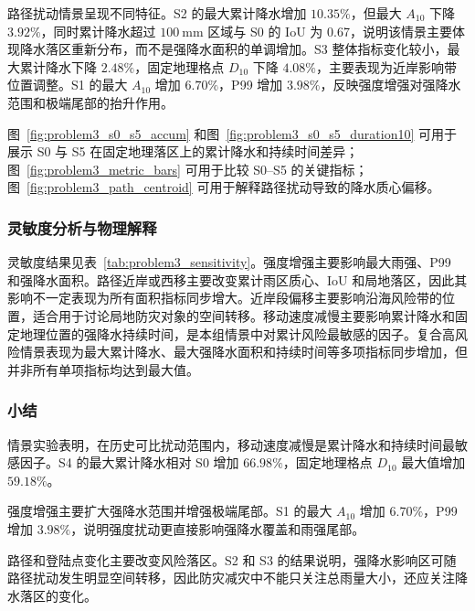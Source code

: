 路径扰动情景呈现不同特征。S2 的最大累计降水增加 $10.35\%$，但最大 $A_{10}$ 下降 $3.92\%$，同时累计降水超过 $100\ \mathrm{mm}$ 区域与 S0 的 IoU 为 0.67，说明该情景主要体现降水落区重新分布，而不是强降水面积的单调增加。S3 整体指标变化较小，最大累计降水下降 $2.48\%$，固定地理格点 $D_{10}$ 下降 $4.08\%$，主要表现为近岸影响带位置调整。S1 的最大 $A_{10}$ 增加 $6.70\%$，P99 增加 $3.98\%$，反映强度增强对强降水范围和极端尾部的抬升作用。

图~\ref{fig:problem3_s0_s5_accum} 和图~\ref{fig:problem3_s0_s5_duration10} 可用于展示 S0 与 S5 在固定地理落区上的累计降水和持续时间差异；图~\ref{fig:problem3_metric_bars} 可用于比较 S0--S5 的关键指标；图~\ref{fig:problem3_path_centroid} 可用于解释路径扰动导致的降水质心偏移。

\subsubsection{灵敏度分析与物理解释}

灵敏度结果见表~\ref{tab:problem3_sensitivity}。强度增强主要影响最大雨强、P99 和强降水面积。路径近岸或西移主要改变累计雨区质心、IoU 和局地落区，因此其影响不一定表现为所有面积指标同步增大。近岸段偏移主要影响沿海风险带的位置，适合用于讨论局地防灾对象的空间转移。移动速度减慢主要影响累计降水和固定地理位置的强降水持续时间，是本组情景中对累计风险最敏感的因子。复合高风险情景表现为最大累计降水、最大强降水面积和持续时间等多项指标同步增加，但并非所有单项指标均达到最大值。

\subsubsection{小结}

情景实验表明，在历史可比扰动范围内，移动速度减慢是累计降水和持续时间最敏感因子。S4 的最大累计降水相对 S0 增加 $66.98\%$，固定地理格点 $D_{10}$ 最大值增加 $59.18\%$。

强度增强主要扩大强降水范围并增强极端尾部。S1 的最大 $A_{10}$ 增加 $6.70\%$，P99 增加 $3.98\%$，说明强度扰动更直接影响强降水覆盖和雨强尾部。

路径和登陆点变化主要改变风险落区。S2 和 S3 的结果说明，强降水影响区可随路径扰动发生明显空间转移，因此防灾减灾中不能只关注总雨量大小，还应关注降水落区的变化。
